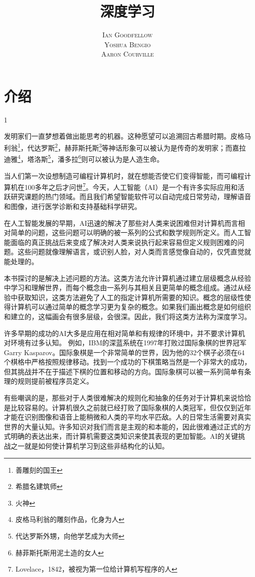 \documentclass[a4paper,11pt]{book}
\title{\Huge \textbf{深度学习} }
\author{\textsc{Ian Goodfellow} \\ \textsc{Yoshua Bengio} \\ \textsc{Aaron Courville}}
\begin{document}
\frontmatter
\maketitle

\tableofcontents
\listoffigures
\listoftables

\mainmatter

\chapter{介绍}{1}


        发明家们一直梦想着做出能思考的机器。这种愿望可以追溯回古希腊时期。皮格马利翁\footnote{善雕刻的国王}，代达罗斯\footnote{希腊名建筑师}，赫菲斯托斯\footnote{火神}等神话形象可以被认为是传奇的发明家；而嘉拉迪雅\footnote{皮格马利翁的雕刻作品，化身为人}，塔洛斯\footnote{代达罗斯外甥，向他学艺成为大师}，潘多拉\footnote{赫菲斯托斯用泥土造的女人}则可以被认为是人造生命。


当人们第一次设想制造可编程计算机时，就在想能否使它们变得智能，而可编程计算机在100多年之后才问世\footnote{Lovelace，1842，被视为第一位给计算机写程序的人}。今天，人工智能（AI）是一个有许多实际应用和活跃研究课题的热门领域。而且我们希望智能软件可以自动完成日常劳动，理解语音和图像，进行医学诊断和支持基础科学研究。


在人工智能发展的早期，AI迅速的解决了那些对人类来说困难但对计算机而言相对简单的问题，这些问题可以明确的被一系列的公式和数学规则所定义。而人工智能面临的真正挑战后来变成了解决对人类来说执行起来容易但定义规则困难的问题。这些问题就像理解语言，或识别人脸，对人类而言感觉像自动的，仅凭直觉就能处理的。

本书探讨的是解决上述问题的方法。这类方法允许计算机通过建立层级概念从经验中学习和理解世界，而每个概念由一系列与其相关且更简单的概念组成。通过从经验中获取知识，这类方法避免了人工的指定计算机所需要的知识。概念的层级性使得计算机可以通过简单的概念学习更为复杂的概念。如果我们画出概念是如何组织和建立的，这幅画会有很多层级，会很深。因此，我们将这类方法称为深度学习。


许多早期的成功的AI大多是应用在相对简单和有规律的环境中，并不要求计算机对环境有过多认知。 例如，IBM的深蓝系统在1997年打败过国际象棋的世界冠军Garry Kasparov。国际象棋是一个非常简单的世界，因为他的32个棋子必须在64个棋格中严格按照规律移动。找到一个成功的下棋策略当然是一个非常大的成功，但其挑战并不在于描述下棋的位置和移动的方向。国际象棋可以被一系列简单有条理的规则提前被程序员定义。


有些嘲讽的是，那些对于人类很难解决的规则化和抽象的任务对于计算机来说恰恰是比较容易的。计算机很久之前就已经打败了国际象棋的人类冠军，但仅仅到近年才能在识别图像和语音上能稍微和人类的平均水平匹敌。人的日常生活需要对真实世界的大量认知。许多知识对我们而言是主观的和本能的，因此很难通过正式的方式明确的表达出来，而计算机需要这类知识来使其表现的更加智能。AI的关键挑战之一就是如何使计算机学习到这些非结构化的认知。
\end{document}
